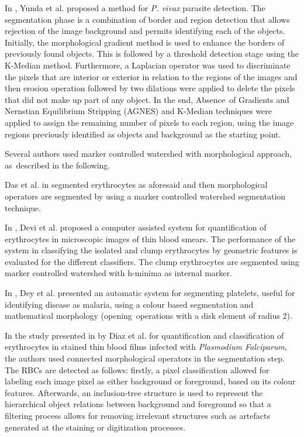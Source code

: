 \documentclass[sensors,review,accept,moreauthors,pdftex,10pt,a4paper]{mdpi}
\begin{document}
In \cite{Yunda2012}, Yunda et al. proposed a method for \textit{P. vivax} parasite detection. The segmentation phase is a combination of border and region detection that allows rejection of the image background and permits identifying each of the objects. Initially, the morphological gradient method is used to enhance the borders of previously found objects. This is followed by a threshold detection stage using the K-Median method.
Furthermore, a Laplacian operator was used to discriminate the pixels that are interior or exterior in relation to the regions of the images and then erosion operation followed by two dilations were applied to delete the pixels that did not make up part of any object. In the end, Absence~of Gradients and Nernstian Equilibrium Stripping (AGNES) and K-Median techniques were applied to assign the remaining number of pixels to each region, using the image regions previously identified as objects and background as the starting point.

Several authors used marker controlled watershed \cite{Soille2004} with morphological approach, as~described in the following.

Das et al. in \cite{Das2011,Das2013,Das2014,Das2015} segmented erythrocytes as aforesaid and then morphological operators  are segmented by using a marker controlled watershed segmentation technique.

In \cite{Devi2017}, Devi et al. proposed a computer assisted system for quantification of erythrocytes in microscopic images of thin blood smears. The performance of the system in classifying the isolated and clump erythrocytes by geometric features is evaluated for the different classifiers. The clump erythrocytes are segmented using marker controlled watershed with h-minima as internal marker.

In \cite{Dey2015}, Dey et al. presented an automatic system for segmenting platelets, useful for identifying disease as malaria, using a colour based segmentation and mathematical morphology (opening~operations with a disk element of radius 2).

In the study presented in \cite{Diaz2009} by Diaz et al. for quantification and classification of erythrocytes in stained thin blood films infected with \textit{Plasmodium Falciparum}, the authors used connected morphological operators in the segmentation step. The RBCs are detected as follows: firstly, a pixel classification allowed for labeling each image pixel as either background or foreground, based on its colour features. Afterwards, an inclusion-tree structure is used to represent the hierarchical object relations between background and foreground so that a filtering process allows for removing irrelevant structures such as artefacts generated at the staining or digitization processes.
\end{document}
